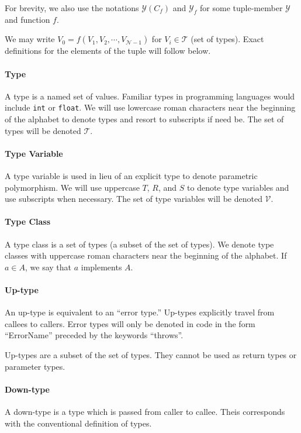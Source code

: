 \documentclass[10pt]{article}
\begin{document}
	For brevity, we also use the notations $\mathcal{Y}(C_f)$ and
	$\mathcal{Y}_f$ for some tuple-member $\mathcal{Y}$ and function $f$.

	We may write $V_0 = f(V_1, V_2, \cdots, V_{\mathcal{N}-1})$ for $V_i \in
	\mathcal{T}$ (set of types). Exact definitions for the elements of the
	tuple will follow below.
	
	\paragraph{Type}
	A type is a named set of values. Familiar types in programming languages
	would include \texttt{int} or \texttt{float}. We will
	use lowercase roman characters near the beginning of the alphabet to denote
	types and resort to subscripts if need be. The set of types will be denoted
	$\mathcal{T}$.
	
	\paragraph{Type Variable}
	A type variable is used in lieu of an explicit type to denote parametric
	polymorphism. We will use uppercase $T$, $R$, and $S$ to denote type
	variables and use subscripts when necessary. The set of type variables will
	be denoted $\mathcal{V}$.
	
	\paragraph{Type Class}
	A type class is a set of types (a subset of the set of types). We denote
	type classes with uppercase roman characters near the beginning of the
	alphabet. If $a \in A$, we say that $a$ implements $A$.
	
	\paragraph{Up-type}
	An up-type is equivalent to an ``error type.''  Up-types explicitly travel
	from callees to callers. Error types will only be denoted in code in the
	form ``ErrorName'' preceded by the keywords ``throws''.

	Up-types are a subset of the set of types. They cannot be used as return
	types or parameter types.
	
	\paragraph{Down-type}
	A down-type is a type which is passed from caller to callee. Theis
	corresponds with the conventional definition of types. 
	
\end{document}
